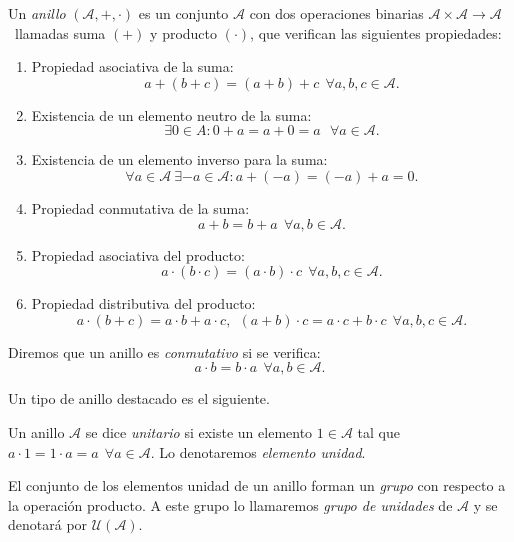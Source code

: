 \begin{definicion} \label{def:anillo}
    Un \emph{anillo} $(\mathcal{A},+,\cdot)$ es un conjunto $\mathcal{A}$ con dos operaciones binarias $\mathcal{A}\times \mathcal{A} \rightarrow \mathcal{A}$ \ llamadas suma $(+)$ y producto $(\cdot)$, que verifican las siguientes propiedades:

    \begin{enumerate}
        \item Propiedad asociativa de la suma: $$ a + (b + c) = (a + b) + c \ \ \forall a,b,c \in \mathcal{A}.$$
        \item Existencia de un elemento neutro de la suma: $$ \exists 0 \in A : 0 + a = a + 0 = a \ \ \ \forall a \in \mathcal{A}.$$
        \item Existencia de un elemento inverso para la suma: $$ \forall a \in \mathcal{A} \ \exists -a \in \mathcal{A} : a + (-a) = (-a) + a = 0.$$
        \item Propiedad conmutativa de la suma: $$ a + b = b + a \ \ \forall a,b \in \mathcal{A}.$$
        \item Propiedad asociativa del producto: $$ a \cdot (b\cdot c) = (a\cdot b)\cdot c \ \ \forall a,b,c \in \mathcal{A}.$$
        \item Propiedad distributiva del producto: $$ a\cdot(b+c) = a\cdot b + a\cdot c, \ \ (a+b)\cdot c = a\cdot c + b\cdot c \ \ \forall a,b,c \in \mathcal{A}.$$
    \end{enumerate}

    Diremos que un anillo es \emph{conmutativo} si se verifica: $$a\cdot b = b\cdot a \ \ \forall a,b \in \mathcal{A}.$$
\end{definicion}

Un tipo de anillo destacado es el siguiente.

\begin{definicion}
    Un anillo $\mathcal{A}$ se dice \emph{unitario} si existe un elemento $1 \in \mathcal{A}$ tal que \\ $a\cdot1 = 1\cdot a = a \ \ \forall a \in \mathcal{A}$. Lo denotaremos \emph{elemento unidad}.
\end{definicion}

El conjunto de los elementos unidad de un anillo forman un \emph{grupo} con respecto a la operación producto. A este grupo lo llamaremos \emph{grupo de unidades} de $\mathcal{A}$ y se denotará por $\mathcal{U}(\mathcal{A})$.


